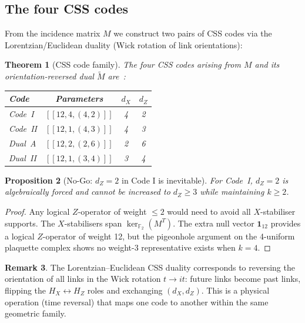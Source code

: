 \documentclass[12pt,a4paper]{article}
\theoremstyle{plain}
\newtheorem{theorem}{Theorem}[section]
\newtheorem{proposition}[theorem]{Proposition}
\theoremstyle{definition}
\newtheorem{remark}[theorem]{Remark}
\newcommand{\GF}[1]{\mathbb{F}_{#1}}
\begin{document}
\subsection{The four CSS codes}

From the incidence matrix $M$ we construct two pairs of CSS codes
via the Lorentzian/Euclidean duality (Wick rotation of link orientations):

\begin{theorem}[CSS code family]
\label{thm:css}
  The four CSS codes arising from $M$ and its orientation-reversed dual $\tilde{M}$
  are~\cite{Schmitt2026b}:
  \begin{center}
  \begin{tabular}{lccc}
  \toprule
  Code & Parameters & $d_X$ & $d_Z$ \\
  \midrule
  Code~I  & $[[12, 4, (4,2)]]$ & 4 & 2 \\
  Code~II & $[[12, 1, (4,3)]]$ & 4 & 3 \\
  Dual~A  & $[[12, 2, (2,6)]]$ & 2 & 6 \\
  Dual~II & $[[12, 1, (3,4)]]$ & 3 & 4 \\
  \bottomrule
  \end{tabular}
  \end{center}
\end{theorem}

\begin{proposition}[No-Go: $d_Z = 2$ in Code I is inevitable]
\label{prop:nogo}
  For Code~I, $d_Z = 2$ is algebraically forced and cannot be increased
  to $d_Z \geq 3$ while maintaining $k \geq 2$.
\end{proposition}

\begin{proof}
  Any logical $Z$-operator of weight $\leq 2$ would need to avoid all
  $X$-stabiliser supports.  The $X$-stabilisers span $\ker_{\GF{2}}(M^T)$.
  The extra null vector $\mathbf{1}_{12}$ provides a logical $Z$-operator of
  weight 12, but the pigeonhole argument on the 4-uniform plaquette complex
  shows no weight-3 representative exists when $k=4$.
\end{proof}

\begin{remark}
  The Lorentzian–Euclidean CSS duality corresponds to reversing the
  orientation of all links in the Wick rotation $t \to it$: future links
  become past links, flipping the $H_X \leftrightarrow H_Z$ roles and
  exchanging $(d_X, d_Z)$.  This is a physical operation (time reversal)
  that maps one code to another within the same geometric family.
\end{remark}
\end{document}
